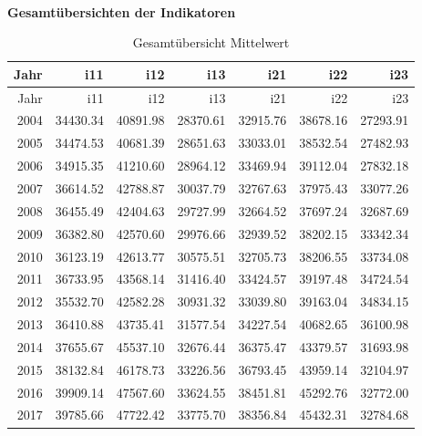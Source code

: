 \documentclass[ngerman,]{article}
\begin{document}
~

\textbf{Gesamtübersichten der Indikatoren}

\begin{longtable}[]{@{}rrrrrrr@{}}
\caption{Gesamtübersicht Mittelwert}\tabularnewline
\toprule
Jahr & i11 & i12 & i13 & i21 & i22 & i23\tabularnewline
\midrule
\endfirsthead
\toprule
Jahr & i11 & i12 & i13 & i21 & i22 & i23\tabularnewline
\midrule
\endhead
2004 & 34430.34 & 40891.98 & 28370.61 & 32915.76 & 38678.16 &
27293.91\tabularnewline
2005 & 34474.53 & 40681.39 & 28651.63 & 33033.01 & 38532.54 &
27482.93\tabularnewline
2006 & 34915.35 & 41210.60 & 28964.12 & 33469.94 & 39112.04 &
27832.18\tabularnewline
2007 & 36614.52 & 42788.87 & 30037.79 & 32767.63 & 37975.43 &
33077.26\tabularnewline
2008 & 36455.49 & 42404.63 & 29727.99 & 32664.52 & 37697.24 &
32687.69\tabularnewline
2009 & 36382.80 & 42570.60 & 29976.66 & 32939.52 & 38202.15 &
33342.34\tabularnewline
2010 & 36123.19 & 42613.77 & 30575.51 & 32705.73 & 38206.55 &
33734.08\tabularnewline
2011 & 36733.95 & 43568.14 & 31416.40 & 33424.57 & 39197.48 &
34724.54\tabularnewline
2012 & 35532.70 & 42582.28 & 30931.32 & 33039.80 & 39163.04 &
34834.15\tabularnewline
2013 & 36410.88 & 43735.41 & 31577.54 & 34227.54 & 40682.65 &
36100.98\tabularnewline
2014 & 37655.67 & 45537.10 & 32676.44 & 36375.47 & 43379.57 &
31693.98\tabularnewline
2015 & 38132.84 & 46178.73 & 33226.56 & 36793.45 & 43959.14 &
32104.97\tabularnewline
2016 & 39909.14 & 47567.60 & 33624.55 & 38451.81 & 45292.76 &
32772.00\tabularnewline
2017 & 39785.66 & 47722.42 & 33775.70 & 38356.84 & 45432.31 &
32784.68\tabularnewline
\bottomrule
\end{longtable}
\end{document}
